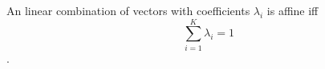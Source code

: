 An linear combination of vectors with coefficients $\lambda_i$ is affine iff $$\sum\limits_{i=1}^K \lambda_i = 1$$.
